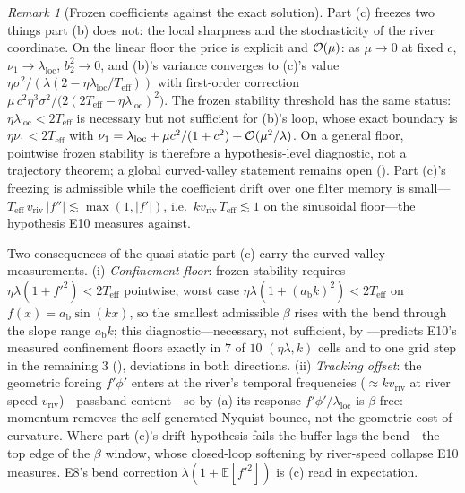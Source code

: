 \documentclass[11pt,a4paper]{article}
\theoremstyle{remark}
\newtheorem{remark}{Remark}
\newcommand{\Teff}{T_{\mathrm{eff}}}
\newcommand{\vriv}{v_{\mathrm{riv}}}
\begin{document}
\begin{remark}[Frozen coefficients against the exact solution]
\label{rem:frozenexact}
Part (c) freezes two things part (b) does not: the local sharpness and the stochasticity of the river coordinate.
On the linear floor the price is explicit and $\mathcal{O}(\mu)$: as $\mu\to0$ at fixed $c$, $\nu_1\to\lambda_{\mathrm{loc}}$, $b_2^2\to0$, and (b)'s variance converges to (c)'s value $\eta\sigma^2/(\lambda(2-\eta\lambda_{\mathrm{loc}}/\Teff))$ with first-order correction $\mu\,c^2\eta^3\sigma^2/\bigl(2(2\Teff-\eta\lambda_{\mathrm{loc}})^2\bigr)$.
The frozen stability threshold has the same status: $\eta\lambda_{\mathrm{loc}}<2\Teff$ is necessary but not sufficient for (b)'s loop, whose exact boundary is $\eta\nu_1<2\Teff$ with $\nu_1=\lambda_{\mathrm{loc}}+\mu c^2/(1+c^2)+\mathcal{O}(\mu^2/\lambda)$.
On a general floor, pointwise frozen stability is therefore a hypothesis-level diagnostic, not a trajectory theorem; a global curved-valley statement remains open ().
Part (c)'s freezing is admissible while the coefficient drift over one filter memory is small---$\Teff\,\vriv\,\lvert f''\rvert\lesssim\max(1,\lvert f'\rvert)$, i.e.\ $k\vriv\,\Teff\lesssim1$ on the sinusoidal floor---the hypothesis E10 measures against.
\end{remark}

Two consequences of the quasi-static part (c) carry the curved-valley measurements.
(i) \emph{Confinement floor}: frozen stability requires $\eta\lambda(1+f'^2)<2\Teff$ pointwise, worst case $\eta\lambda(1+(a_{\mathrm{b}}k)^2)<2\Teff$ on $f(x)=a_{\mathrm{b}}\sin(kx)$, so the smallest admissible $\beta$ rises with the bend through the slope range $a_{\mathrm{b}}k$; this diagnostic---necessary, not sufficient, by ---predicts E10's measured confinement floors exactly in $7$ of $10$ $(\eta\lambda,k)$ cells and to one grid step in the remaining $3$ (), deviations in both directions.
(ii) \emph{Tracking offset}: the geometric forcing $f'\phi'$ enters at the river's temporal frequencies ($\approx k\vriv$ at river speed $\vriv$)---passband content---so by (a) its response $f'\phi'/\lambda_{\mathrm{loc}}$ is $\beta$-free: momentum removes the self-generated Nyquist bounce, not the geometric cost of curvature.
Where part (c)'s drift hypothesis fails the buffer lags the bend---the top edge of the $\beta$ window, whose closed-loop softening by river-speed collapse E10 measures.
E8's bend correction $\lambda(1+\mathbb{E}[f'^2])$ is (c) read in expectation.
\end{document}
